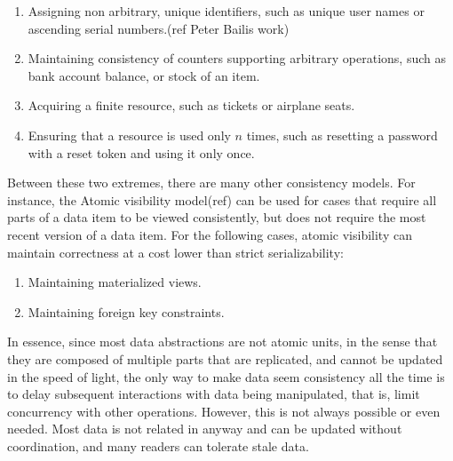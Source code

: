 \begin{enumerate}

\item Assigning non arbitrary, unique identifiers, such as unique user names or
ascending serial numbers.(ref Peter Bailis work)

\item Maintaining consistency of counters supporting arbitrary operations, such
as bank account balance, or stock of an item. 

\item Acquiring a finite resource, such as tickets or airplane seats. 

\item Ensuring that a resource is used only $n$ times, such as resetting a
password with a reset token and using it only once. 
\end{enumerate}

 Between these two extremes, there are many other consistency models. For
 instance, the Atomic visibility model(ref) can be used for cases that
 require all parts of a data item to be viewed consistently, but does not require
 the most recent version of a data item. For the following cases, 
 atomic visibility can maintain correctness at a cost lower than strict
 serializability: 
\begin{enumerate}
\item Maintaining materialized views.
\item Maintaining foreign key constraints.
\end{enumerate}


In essence, since most data abstractions are not atomic units, in the sense that they
are composed of multiple parts that are replicated, and cannot be updated in the
speed of light, the only way to make data seem consistency all the time is to
delay subsequent interactions with data being manipulated, that is, limit
concurrency with other operations. However, this is not always possible or even
needed. Most data is not related in anyway and can be updated without
coordination, and many readers can tolerate stale data. 

